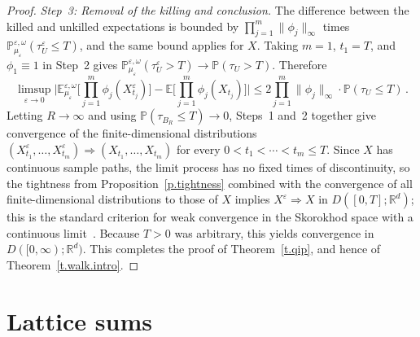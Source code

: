 \documentclass[11pt]{amsart}
\theoremstyle{plain}
\theoremstyle{definition}
\theoremstyle{remark}
\newcommand{\E}{\mathbb{E}}
\newcommand{\Rd}{\mathbb{R}^d}
\newcommand{\eps}{\varepsilon}
\renewcommand{\P}{\mathbb{P}}
\begin{document}
\begin{proof}
		\emph{Step~3: Removal of the killing and conclusion.}
		The difference between the killed and unkilled expectations is bounded by $\prod_{j=1}^m \|\phi_j\|_\infty$ times $\P_{\mu_\eps}^{\eps,\omega}(\tau_U^\eps \le T)$, and the same bound applies for $X$.
		Taking $m = 1$, $t_1 = T$, and $\phi_1 \equiv 1$ in Step~2 gives $\P_{\mu_\eps}^{\eps,\omega}(\tau_U^\eps > T) \to \P(\tau_U > T)$.
		Therefore
		\[
		\limsup_{\eps \to 0}
		\biggl|\E_{\mu_\eps}^{\eps,\omega}\biggl[\prod_{j=1}^m \phi_j(X_{t_j}^\eps)\biggr]
		- \E\biggl[\prod_{j=1}^m \phi_j(X_{t_j})\biggr]\biggr|
		\le 2\prod_{j=1}^m \|\phi_j\|_\infty \cdot \P(\tau_U \le T)\,.
		\]
		Letting $R \to \infty$ and using $\P(\tau_{B_R} \le T) \to 0$, Steps~1 and~2 together give convergence of the finite-dimensional distributions $(X_{t_1}^\eps, \ldots, X_{t_m}^\eps) \Rightarrow (X_{t_1}, \ldots, X_{t_m})$ for every $0 < t_1 < \cdots < t_m \le T$.
		Since $X$ has continuous sample paths, the limit process has no fixed times of discontinuity, so the tightness from Proposition~\ref{p.tightness} combined with the convergence of all finite-dimensional distributions to those of $X$ implies $X^\eps \Rightarrow X$ in $D([0,T]; \Rd)$; this is the standard criterion for weak convergence in the Skorokhod space with a continuous limit~\cite[Theorem~13.1]{Billingsley1999}.
		Because $T > 0$ was arbitrary, this yields convergence in $D([0,\infty); \Rd)$.
		This completes the proof of Theorem~\ref{t.qip}, and hence of Theorem~\ref{t.walk.intro}.
	\end{proof}
	
	\appendix
	\section{Lattice sums}
	\label{sec:lattice}
	
\end{document}
